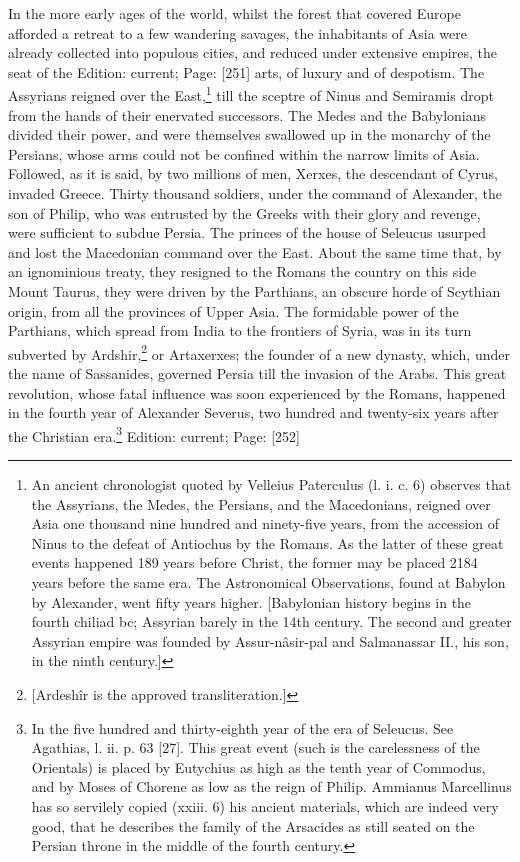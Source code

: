 In the more early ages of the world, whilst the forest that covered Europe afforded a retreat to a few wandering savages, the inhabitants of Asia were already collected into populous cities, and reduced under extensive empires, the seat of the Edition: current; Page: [251] arts, of luxury and of despotism. The Assyrians reigned over the East,\footnote{An ancient chronologist quoted by Velleius Paterculus (l. i. c. 6) observes that the Assyrians, the Medes, the Persians, and the Macedonians, reigned over Asia one thousand nine hundred and ninety-five years, from the accession of Ninus to the defeat of Antiochus by the Romans. As the latter of these great events happened 189 years before Christ, the former may be placed 2184 years before the same era. The Astronomical Observations, found at Babylon by Alexander, went fifty years higher. [Babylonian history begins in the fourth chiliad bc; Assyrian barely in the 14th century. The second and greater Assyrian empire was founded by Assur-nâsir-pal and Salmanassar II., his son, in the ninth century.]} till the sceptre of Ninus and Semiramis dropt from the hands of their enervated successors. The Medes and the Babylonians divided their power, and were themselves swallowed up in the monarchy of the Persians, whose arms could not be confined within the narrow limits of Asia. Followed, as it is said, by two millions of men, Xerxes, the descendant of Cyrus, invaded Greece. Thirty thousand soldiers, under the command of Alexander, the son of Philip, who was entrusted by the Greeks with their glory and revenge, were sufficient to subdue Persia. The princes of the house of Seleucus usurped and lost the Macedonian command over the East. About the same time that, by an ignominious treaty, they resigned to the Romans the country on this side Mount Taurus, they were driven by the Parthians, an obscure horde of Scythian origin, from all the provinces of Upper Asia. The formidable power of the Parthians, which spread from India to the frontiers of Syria, was in its turn subverted by Ardshir,\footnote{[Ardeshîr is the approved transliteration.]} or Artaxerxes; the founder of a new dynasty, which, under the name of Sassanides, governed Persia till the invasion of the Arabs. This great revolution, whose fatal influence was soon experienced by the Romans, happened in the fourth year of Alexander Severus, two hundred and twenty-six years after the Christian era.\footnote{In the five hundred and thirty-eighth year of the era of Seleucus. See Agathias, l. ii. p. 63 [27]. This great event (such is the carelessness of the Orientals) is placed by Eutychius as high as the tenth year of Commodus, and by Moses of Chorene as low as the reign of Philip. Ammianus Marcellinus has so servilely copied (xxiii. 6) his ancient materials, which are indeed very good, that he describes the family of the Arsacides as still seated on the Persian throne in the middle of the fourth century.}
Edition: current; Page: [252]

